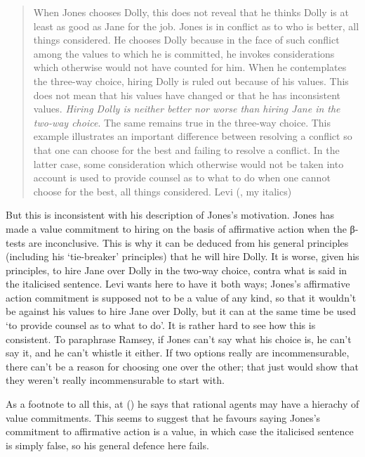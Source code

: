 \documentclass[
  11pt,
  letterpaper,
  DIV=11,
  numbers=noendperiod,
  twoside]{scrartcl}
\begin{document}
\begin{quote}
When Jones chooses Dolly, this does not reveal that he thinks Dolly is
at least as good as Jane for the job. Jones is in conflict as to who is
better, all things considered. He chooses Dolly because in the face of
such conflict among the values to which he is committed, he invokes
considerations which otherwise would not have counted for him. When he
contemplates the three-way choice, hiring Dolly is ruled out because of
his values. This does not mean that his values have changed or that he
has inconsistent values. \emph{Hiring Dolly is neither better nor worse
than hiring Jane in the two-way choice}. The same remains true in the
three-way choice. This example illustrates an important difference
between resolving a conflict so that one can choose for the best and
failing to resolve a conflict. In the latter case, some consideration
which otherwise would not be taken into account is used to provide
counsel as to what to do when one cannot choose for the best, all things
considered. Levi (, my italics)
\end{quote}

But this is inconsistent with his description of Jones's motivation.
Jones has made a value commitment to hiring on the basis of affirmative
action when the β-tests are inconclusive. This is why it can be deduced
from his general principles (including his `tie-breaker' principles)
that he will hire Dolly. It is worse, given his principles, to hire Jane
over Dolly in the two-way choice, contra what is said in the italicised
sentence. Levi wants here to have it both ways; Jones's affirmative
action commitment is supposed not to be a value of any kind, so that it
wouldn't be against his values to hire Jane over Dolly, but it can at
the same time be used `to provide counsel as to what to do'. It is
rather hard to see how this is consistent. To paraphrase Ramsey, if
Jones can't say what his choice is, he can't say it, and he can't
whistle it either. If two options really are incommensurable, there
can't be a reason for choosing one over the other; that just would show
that they weren't really incommensurable to start with.

As a footnote to all this, at () he
says that rational agents may have a hierachy of value commitments. This
seems to suggest that he favours saying Jones's commitment to
affirmative action is a value, in which case the italicised sentence is
simply false, so his general defence here fails.
\end{document}

